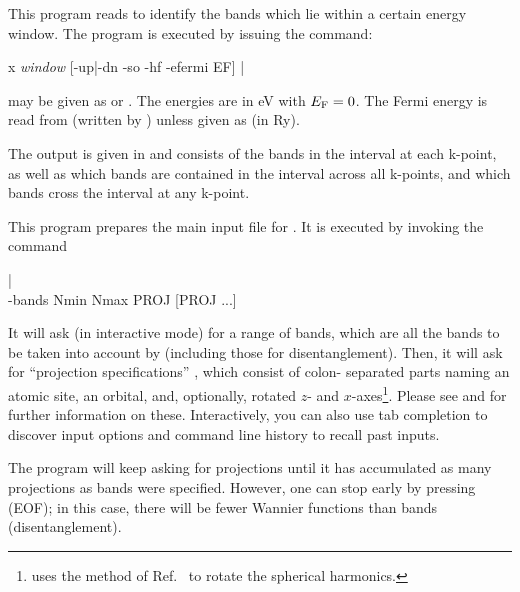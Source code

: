 
This program reads  to identify the bands which
lie within a certain energy window. The program \findbands is
executed by issuing the command:
%
\begin{usage}
  x \findbands \textit{window} [-up|-dn -so -hf -efermi EF]
  |
  \\
  \findbands {}
\end{usage}
%
 may be given as  or
.  The energies are in eV with $E_\text F = 0$.  The
Fermi energy is read from  (written by \prepwiiw)
unless given as  (in Ry).

The output is given in  and consists of the
bands in the interval at each k-point, as well as which bands are
contained in the interval across all k-points, and which bands cross
the interval at any k-point.



This program prepares the main input file  for
\wiiw.  It is executed by invoking the command
%
\begin{usage}
  \writeinwf {} |
  \\
  \writeinwf{} -bands Nmin Nmax PROJ [PROJ ...]
\end{usage}
%
It will ask (in interactive mode) for a range of bands, which are all
the bands to be taken into account by \wiiw (including those for
disentanglement).  Then, it will ask for ``projection specifications''
, which consist of colon-
separated parts naming an atomic site, an orbital, and, optionally,
rotated $z$- and $x$-axes\footnote{\writeinwf uses the method of
  Ref.~\cite{ylmrot} to rotate the spherical harmonics.}.  Please see
 and 
for further information on these.  Interactively, you can also use tab
completion to discover input options and command line history to
recall past inputs.

The program will keep asking for projections until it has accumulated
as many projections as bands were specified.  However, one can stop
early by pressing  (EOF); in this case, there will be
fewer Wannier functions than bands (disentanglement).




